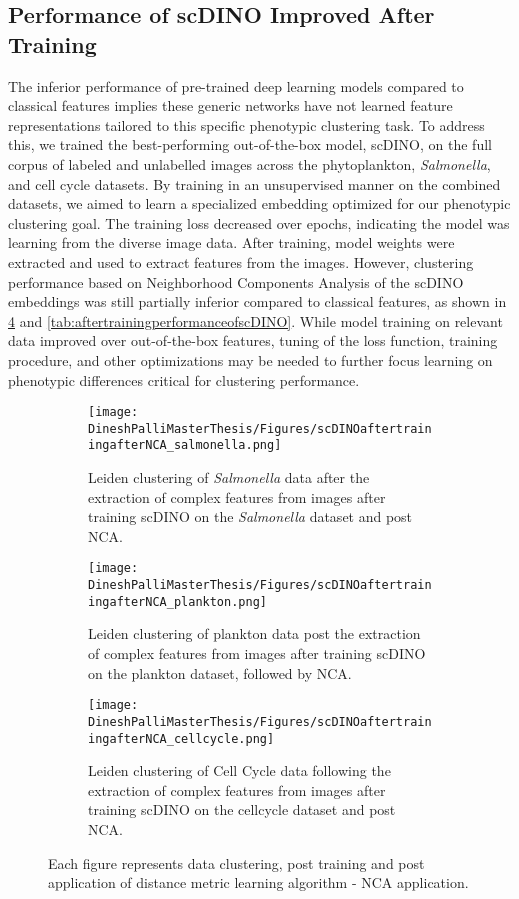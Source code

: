 \documentclass[12pt,a4paper]{article}
\begin{document}

\subsection{Performance of scDINO Improved After Training}

The inferior performance of pre-trained deep learning models compared to classical features implies these generic networks have not learned feature representations tailored to this specific phenotypic clustering task. To address this, we trained the best-performing out-of-the-box model, scDINO, on the full corpus of labeled and unlabelled images across the phytoplankton, \textit{Salmonella}, and cell cycle datasets. By training in an unsupervised manner on the combined datasets, we aimed to learn a specialized embedding optimized for our phenotypic clustering goal. The training loss decreased over epochs, indicating the model was learning from the diverse image data. After training, model weights were extracted and used to extract features from the images. However, clustering performance based on Neighborhood Components Analysis of the scDINO embeddings was still partially inferior compared to classical features, as shown in \ref{multifig7:ClustersaftertrainingscDINO} and \ref{tab:aftertrainingperformanceofscDINO}. While model training on relevant data improved over out-of-the-box features, tuning of the loss function, training procedure, and other optimizations may be needed to further focus learning on phenotypic differences critical for clustering performance.


\begin{figure}
  \centering
  \begin{subfigure}{\linewidth}
    \texttt{[image: DineshPalliMasterThesis/Figures/scDINOaftertrainingafterNCA\_salmonella.png]}
    \caption{Leiden clustering of \textit{Salmonella} data after the extraction of complex features from images after training scDINO on the \textit{Salmonella} dataset and post NCA.}
    \label{multifig7:image_a}
  \end{subfigure}
  \hfill
  \begin{subfigure}{\linewidth}
    \texttt{[image: DineshPalliMasterThesis/Figures/scDINOaftertrainingafterNCA\_plankton.png]}
    \caption{Leiden clustering of plankton data post the extraction of complex features from images after training scDINO on the plankton dataset, followed by NCA.}
    \label{multifig7:image_b}
  \end{subfigure}
  \hfill
  \begin{subfigure}{0.3\linewidth}
    \texttt{[image: DineshPalliMasterThesis/Figures/scDINOaftertrainingafterNCA\_cellcycle.png]}
    \caption{Leiden clustering of Cell Cycle data following the extraction of complex features from images after training scDINO on the cellcycle dataset and post NCA.}
    \label{multifig7:image_c}
  \end{subfigure}
  \caption{Each figure represents data clustering, post training and post application of distance metric learning algorithm - NCA application.}
  \label{multifig7:ClustersaftertrainingscDINO}
\end{figure}
\end{document}
